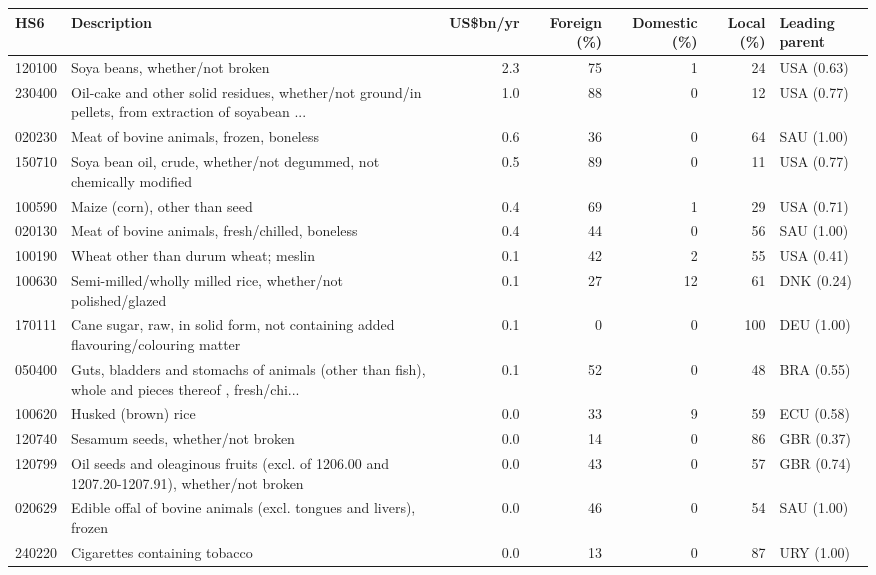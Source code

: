 \begin{tabular}{@{}l p{6.4cm} r r r r l@{}}
\toprule
HS6 & Description & US\$bn/yr & Foreign (\%) & Domestic (\%) & Local (\%) & Leading parent \\
\midrule
120100 & Soya beans, whether/\allowbreak{}not broken & 2.3 & 75 & 1 & 24 & USA (0.63) \\
230400 & Oil-cake and other solid residues, whether/\allowbreak{}not ground/\allowbreak{}in pellets, from extraction of soyabean ... & 1.0 & 88 & 0 & 12 & USA (0.77) \\
020230 & Meat of bovine animals, frozen, boneless & 0.6 & 36 & 0 & 64 & SAU (1.00) \\
150710 & Soya bean oil, crude, whether/\allowbreak{}not degummed, not chemically modified & 0.5 & 89 & 0 & 11 & USA (0.77) \\
100590 & Maize (corn), other than seed & 0.4 & 69 & 1 & 29 & USA (0.71) \\
020130 & Meat of bovine animals, fresh/\allowbreak{}chilled, boneless & 0.4 & 44 & 0 & 56 & SAU (1.00) \\
100190 & Wheat other than durum wheat; meslin & 0.1 & 42 & 2 & 55 & USA (0.41) \\
100630 & Semi-milled/\allowbreak{}wholly milled rice, whether/\allowbreak{}not polished/\allowbreak{}glazed & 0.1 & 27 & 12 & 61 & DNK (0.24) \\
170111 & Cane sugar, raw, in solid form, not containing added flavouring/\allowbreak{}colouring matter & 0.1 & 0 & 0 & 100 & DEU (1.00) \\
050400 & Guts, bladders and stomachs of animals (other than fish), whole and pieces thereof , fresh/\allowbreak{}chi... & 0.1 & 52 & 0 & 48 & BRA (0.55) \\
100620 & Husked (brown) rice & 0.0 & 33 & 9 & 59 & ECU (0.58) \\
120740 & Sesamum seeds, whether/\allowbreak{}not broken & 0.0 & 14 & 0 & 86 & GBR (0.37) \\
120799 & Oil seeds and oleaginous fruits (excl. of 1206.00 and 1207.20-1207.91), whether/\allowbreak{}not broken & 0.0 & 43 & 0 & 57 & GBR (0.74) \\
020629 & Edible offal of bovine animals (excl. tongues and livers), frozen & 0.0 & 46 & 0 & 54 & SAU (1.00) \\
240220 & Cigarettes containing tobacco & 0.0 & 13 & 0 & 87 & URY (1.00) \\
\bottomrule
\end{tabular}

